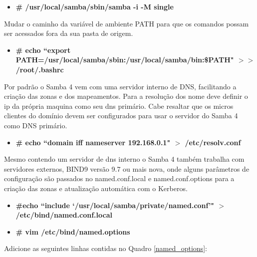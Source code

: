 \begin{itemize}
	\item \textbf{\# /usr/local/samba/sbin/samba -i -M single}
\end{itemize}




Mudar o caminho da variável de ambiente PATH para que os comandos possam ser acessados fora da sua pasta de origem.

\begin{itemize}
	\item \textbf{\# echo ``export PATH=/usr/local/samba/sbin:/usr/local/samba/bin:\$PATH" $>$$>$ \\ /root/.bashrc}
\end{itemize}

Por padrão o Samba 4 vem com uma servidor interno de DNS, facilitando a criação das zonas e dos mapeamentos. Para a resolução dos nome deve definir o ip da própria maquina como seu dns primário. Cabe resaltar que os micros clientes do domínio devem ser configurados para usar o servidor do Samba 4 como DNS primário.

\begin{itemize}
	\item \textbf{\# echo ``domain iff nameserver 192.168.0.1" $>$ /etc/resolv.conf}
\end{itemize}

Mesmo contendo um servidor de dns interno o Samba 4 também trabalha com servidores externos, BIND9 versão 9.7 ou mais nova, onde alguns parâmetros de configuração são passados no named.conf.local e named.conf.options para a criação das zonas e atualização automática com o Kerberos.

\begin{itemize}
	\item \textbf{\#echo ``include `/usr/local/samba/private/named.conf'" $>$ /etc/bind/named.conf.local}
	\item \textbf{\# vim /etc/bind/named.options}
\end{itemize}

Adicione as seguintes linhas contidas no Quadro \ref{named_options}:\\

